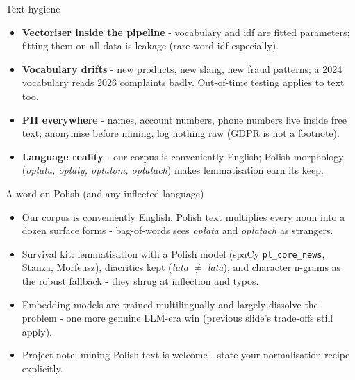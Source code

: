 \documentclass[10pt,aspectratio=169]{beamer}
\begin{document}
\begin{frame}{Text hygiene}
  \begin{itemize}
    \item \textbf{Vectoriser inside the pipeline} - vocabulary and idf
          are fitted parameters; fitting them on all data is leakage
          (rare-word idf especially).
    \item \textbf{Vocabulary drifts} - new products, new slang, new
          fraud patterns; a 2024 vocabulary reads 2026 complaints badly.
          Out-of-time testing applies to text too.
    \item \textbf{PII everywhere} - names, account numbers, phone
          numbers live inside free text; anonymise before mining, log
          nothing raw (GDPR is not a footnote).
    \item \textbf{Language reality} - our corpus is conveniently
          English; Polish morphology (\emph{opłata, opłaty, opłatom,
          opłatach}) makes lemmatisation earn its keep.
  \end{itemize}
\end{frame}

\begin{frame}{A word on Polish (and any inflected language)}
  \begin{itemize}
    \item Our corpus is conveniently English. Polish text multiplies every
          noun into a dozen surface forms - bag-of-words sees
          \emph{opłata} and \emph{opłatach} as strangers.
    \item Survival kit: lemmatisation with a Polish model (spaCy
          \texttt{pl\_core\_news}, Stanza, Morfeusz), diacritics kept
          (\emph{łata} $\ne$ \emph{lata}), and \alert{character n-grams}
          as the robust fallback - they shrug at inflection and typos.
    \item Embedding models are trained multilingually and largely dissolve
          the problem - one more genuine LLM-era win (previous slide's
          trade-offs still apply).
    \item Project note: mining Polish text is welcome - state your
          normalisation recipe explicitly.
  \end{itemize}
\end{frame}
\end{document}
